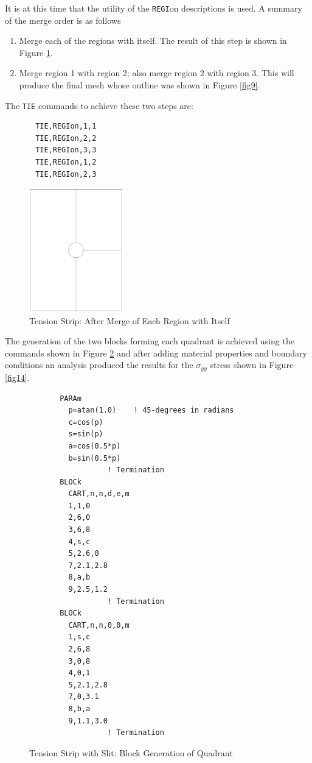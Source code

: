 It is at this time that the utility of the {\tt REGI}on descriptions is
used.  A summary of the merge order is as follows

\begin{enumerate}
\item
Merge each of the regions with itself.  The result of this step is shown
in Figure \ref{fig12}.
\item
Merge region 1 with region 2; also merge region 2 with region 3.
This will produce the final mesh whose outline was shown in Figure \ref{fig9}.
\end{enumerate}
The {\tt TIE} commands to achieve these two steps are:
\begin{verbatim}
       TIE,REGIon,1,1
       TIE,REGIon,2,2
       TIE,REGIon,3,3
       TIE,REGIon,1,2
       TIE,REGIon,2,3
\end{verbatim}

\begin{figure}[ht!]
\centerline {\hfil \includegraphics[width=1.6in]{figs/figo2} \hfil}
\caption{Tension Strip: After Merge of Each Region with Itself}
\label{fig12}
\end{figure}
The  generation of the two blocks forming each quadrant
is achieved using the commands shown
in Figure \ref{fig13} and after adding material properties and boundary
conditions an analysis produced the results for the $\sigma_{yy}$ stress
shown in Figure \ref{fig14}.

\begin{figure}
\begin{verbatim}
       PARAm
         p=atan(1.0)    ! 45-degrees in radians
         c=cos(p)
         s=sin(p)
         a=cos(0.5*p)
         b=sin(0.5*p)
                  ! Termination
       BLOCk
         CART,n,n,d,e,m
         1,1,0
         2,6,0
         3,6,8
         4,s,c
         5,2.6,0
         7,2.1,2.8
         8,a,b
         9,2.5,1.2
                  ! Termination
       BLOCk
         CART,n,n,0,0,m
         1,s,c
         2,6,8
         3,0,8
         4,0,1
         5,2.1,2.8
         7,0,3.1
         8,b,a
         9,1.1,3.0
                  ! Termination
\end{verbatim}
\caption{Tension Strip with Slit: Block Generation of Quadrant}
\label{fig13}
\end{figure}

